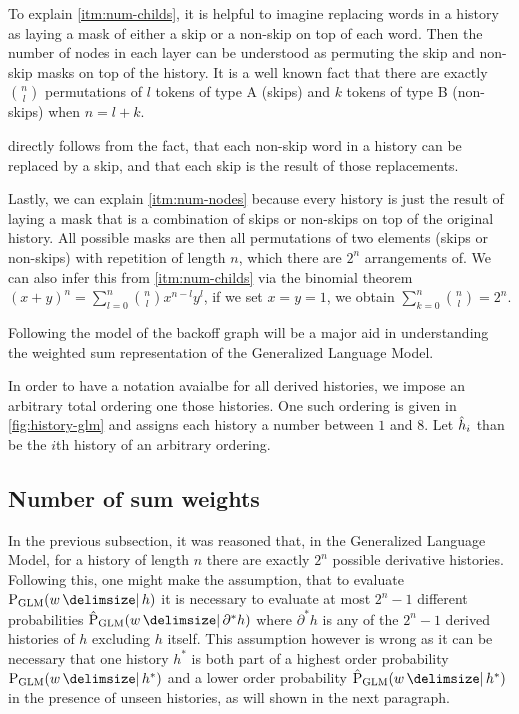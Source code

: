 To explain \cref{itm:num-childs}, it is helpful to imagine replacing words in
a history as laying a mask of either a skip or a non-skip on top of each word.
Then the number of nodes in each layer can be understood as permuting the
skip and non-skip masks on top of the history.
It is a well known fact that there are exactly $\binom{n}{l}$ permutations of
$l$ tokens of type A (skips) and $k$ tokens of type B (non-skips) when
$n = l + k$.

 directly follows from the fact, that each non-skip word
in a history can be replaced by a skip, and that each skip is the result
of those replacements.

Lastly, we can explain \cref{itm:num-nodes} because every history is just the
result of laying a mask that is a combination of skips or non-skips on top of
the original history.
All possible masks are then all permutations of two elements (skips or
non-skips) with repetition of length $n$, which there are $2^n$ arrangements of.
We can also infer this from \cref{itm:num-childs} via the binomial theorem
$(x+ y)^n = \sum_{l=0}^n \binom{n}{l} x^{n-l} y^l$, if we set ${x = y = 1}$,
we obtain $\sum_{k=0}^n \binom{n}{l} = 2^n$.

Following the model of the backoff graph will be a major aid in understanding
the weighted sum representation of the Generalized Language Model.

In order to have a notation avaialbe for all derived histories, we impose an
arbitrary total ordering one those histories.
One such ordering is given in \cref{fig:history-glm} and assigns each history
a number between $1$ and $8$.
Let $\DerivedHistory[i]$ than be the $i$th history of an arbitrary ordering.

\subsection{Number of sum weights}

In the previous subsection, it was reasoned that, in the Generalized Language
Model, for a history of length $n$ there are exactly $2^n$ possible derivative
histories.
Following this, one might make the assumption, that to evaluate $\ProbGLM{w}{h}$
it is necessary to evaluate at most $2^n - 1$  different probabilities
$\ProbGLM*{w}{\partial^* h}$ where $\partial^* h$ is any of the $2^n - 1$
derived histories of $h$ excluding $h$ itself.
This assumption however is wrong as it can be necessary that one history $h^*$
is both part of a highest order probability $\ProbGLM{w}{h^*}$ and a lower order
probability $\ProbGLM*{w}{h^*}$ in the presence of unseen histories, as will
shown in the next paragraph.

